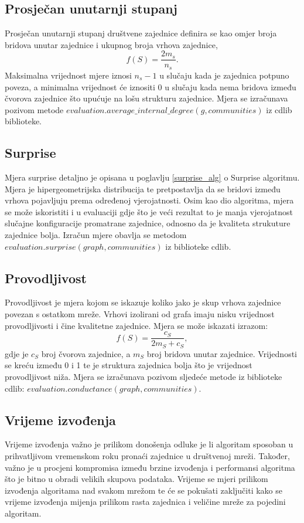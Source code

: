 \pagebreak
\subsection{Prosječan unutarnji stupanj}
Prosječan unutarnji stupanj društvene zajednice definira se kao omjer broja bridova unutar zajednice i ukupnog broja vrhova zajednice,
\begin{equation}
	f(S) =  \frac{2m_{s}}{n_{s}}.
\end{equation}
Maksimalna vrijednost mjere iznosi $n_{s} - 1$ u slučaju kada je zajednica potpuno poveza, a minimalna vrijednost će iznositi 0 u slučaju kada nema bridova između čvorova zajednice što upućuje na lošu strukturu zajednice. Mjera se izračunava pozivom metode $evaluation.average\_internal\_degree(g,communities)$ iz cdlib biblioteke.


\subsection{Surprise}
Mjera surprise detaljno je opisana u poglavlju \ref{surprise_alg} o Surprise algoritmu. Mjera je hipergeometrijska distribucija te pretpostavlja da se bridovi između vrhova pojavljuju prema određenoj vjerojatnosti. Osim kao dio algoritma, mjera se može iskoristiti i u evaluaciji gdje što je veći rezultat to je manja vjerojatnost slučajne konfiguracije promatrane zajednice, odnosno da je kvaliteta strukuture zajednice bolja. Izračun mjere obavlja se metodom $evaluation.surprise(graph, communities)$ iz biblioteke cdlib.


\subsection{Provodljivost}
Provodljivost je mjera kojom se iskazuje koliko jako je skup vrhova zajednice povezan s ostatkom mreže. Vrhovi izolirani od grafa imaju nisku vrijednost provodljivosti i čine kvalitetne zajednice. Mjera se može iskazati izrazom:
\begin{equation}
	f(S) = \frac{c_{S}}{2m_{S} + c_{S}},
\end{equation}
gdje je $c_{S}$ broj čvorova zajednice, a $m_{S}$ broj bridova unutar zajednice. Vrijednosti se kreću između 0 i 1 te je struktura zajednica bolja što je vrijednost provodljivost niža. Mjera se izračunava pozivom sljedeće metode iz biblioteke cdlib: $evaluation.conductance(graph, communities)$.


\subsection{Vrijeme izvođenja}
Vrijeme izvođenja važno je prilikom donošenja odluke je li algoritam sposoban u prihvatljivom vremenskom roku pronaći zajednice u društvenoj mreži. Također, važno je u procjeni kompromisa između brzine izvođenja i performansi algoritma što je bitno u obradi velikih skupova podataka. Vrijeme se mjeri prilikom izvođenja algoritama nad svakom mrežom te će se pokušati zaključiti kako se vrijeme izvođenja mijenja prilikom rasta zajednica i veličine mreže za pojedini algoritam.


